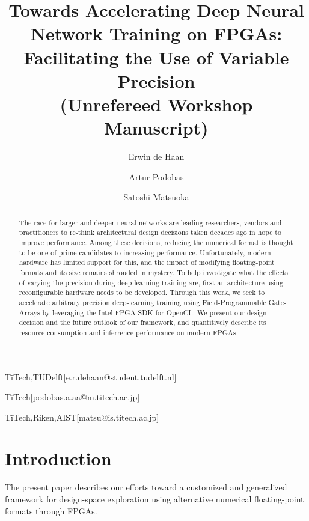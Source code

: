 \documentclass[techrep,english]{ipsj} %
\begin{document}
\title{Towards Accelerating Deep Neural Network Training on FPGAs: Facilitating the Use of Variable Precision\\ \Large{(Unrefereed Workshop Manuscript)}}


\author{Erwin de Haan}{TiTech,TUDelft}[e.r.dehaan@student.tudelft.nl]
\author{Artur Podobas}{TiTech}[podobas.a.aa@m.titech.ac.jp]
\author{Satoshi Matsuoka}{TiTech,Riken,AIST}[matsu@is.titech.ac.jp]

\begin{abstract}
The race for larger and deeper neural networks are leading researchers, vendors and practitioners to re-think architectural design decisions taken decades ago in hope to improve performance.
Among these decisions, reducing the numerical format is thought to be one of prime candidates to increasing performance.
Unfortunately, modern hardware has limited support for this, and the impact of modifying floating-point formats and its size remains shrouded in mystery.
To help investigate what the effects of varying the precision during deep-learning training are, first an architecture using reconfigurable hardware needs to be developed.
Through this work, we seek to accelerate arbitrary precision deep-learning training using Field-Programmable Gate-Arrays by leveraging the Intel FPGA SDK for OpenCL. We present our design decision and the future outlook of our framework, and quantitively describe its resource consumption and inferrence performance on modern FPGAs.
\end{abstract}

\maketitle

\section{Introduction}
The present paper describes our efforts toward a customized and generalized framework for design-space exploration using alternative numerical floating-point formats through FPGAs.
\end{document}
